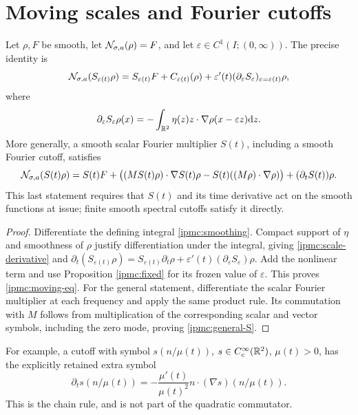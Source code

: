 \section{Moving scales and Fourier cutoffs}
\begin{proposition}\label{ipmc:moving}
Let $\rho,F$ be smooth, let $\mathcal N_{\sigma,a}(\rho)=F$, and let
$\varepsilon\in C^1(I;(0,\infty))$. The precise identity is
\begin{equation}\label{ipmc:moving-eq}
\mathcal N_{\sigma,a}(S_{\varepsilon(t)}\rho)
=S_{\varepsilon(t)}F+C_{\varepsilon(t)}(\rho)
+\varepsilon'(t)(\partial_\varepsilon S_\varepsilon)_{\varepsilon=\varepsilon(t)}\rho,
\end{equation}
where
\begin{equation}\label{ipmc:scale-derivative}
\partial_\varepsilon S_\varepsilon\rho(x)
=-\int_{\mathbb R^2}\eta(z)z\cdot\nabla\rho(x-\varepsilon z)\mathrm d z.
\end{equation}
More generally, a smooth scalar Fourier multiplier $S(t)$, including a smooth
Fourier cutoff, satisfies
\begin{equation}\label{ipmc:general-S}
\mathcal N_{\sigma,a}(S(t)\rho)
=S(t)F+\bigl((MS(t)\rho)\cdot\nabla S(t)\rho
-S(t)((M\rho)\cdot\nabla\rho)\bigr)+(\partial_tS(t))\rho.
\end{equation}
This last statement requires that $S(t)$ and its time derivative act on the
smooth functions at issue; finite smooth spectral cutoffs satisfy it directly.
\end{proposition}
\begin{proof}
Differentiate the defining integral \eqref{ipmc:smoothing}. Compact support
of $\eta$ and smoothness of $\rho$ justify differentiation under the integral,
giving \eqref{ipmc:scale-derivative} and
$\partial_t(S_{\varepsilon(t)}\rho)
=S_{\varepsilon(t)}\partial_t\rho+
\varepsilon'(t)(\partial_\varepsilon S_\varepsilon)\rho$.
Add the nonlinear term and use Proposition \ref{ipmc:fixed} for its frozen
value of $\varepsilon$. This proves \eqref{ipmc:moving-eq}.
For the general statement, differentiate the scalar Fourier multiplier at each
frequency and apply the same product rule. Its commutation with $M$ follows
from multiplication of the corresponding scalar and vector symbols, including
the zero mode, proving \eqref{ipmc:general-S}.
\end{proof}

For example, a cutoff with symbol $s(n/\mu(t))$, $s\in C_c^\infty(\mathbb R^2)$,
$\mu(t)>0$, has the explicitly retained extra symbol
\[
\partial_t s(n/\mu(t))=-\frac{\mu'(t)}{\mu(t)^2}
n\cdot(\nabla s)(n/\mu(t)).
\]
This is the chain rule, and is not part of the quadratic commutator.

